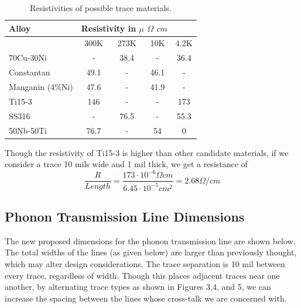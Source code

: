 \documentclass{report}
\begin{document}
\begin{table}[h]
\centering
\begin{threeparttable}
\begin{tabular}{l|c|c|c|c}
Alloy & \multicolumn{3}{c}{Resistivity in $\mu$ $\Omega$ $cm$} \\\toprule
 & 300K & 273K & 10K & 4.2K \\\midrule
70Cu-30Ni & - & 38.4 & - & 36.4 \\
Constantan & 49.1 & - & 46.1 & - \\
Manganin (4\%Ni) & 47.6 & - & 41.9 & - \\
Ti15-3 & 146 & - & - & 173 \\
SS316 & - & 76.5 & - & 55.3 \\
50Nb-50Ti & 76.7 & - & 54 & 0 \\
\end{tabular}
\end{threeparttable}
\caption{Resistivities of possible trace materials.}
\end{table}

Though the resistivity of Ti15-3 is higher than other candidate materials, if we consider a trace 10 mils wide and 1 mil thick, we get a resistance of
$$
\frac{R}{Length} = \frac{173 \cdot 10^{-6} \Omega cm}{6.45 \cdot 10^{-5} cm^{2}} = 2.68 \Omega / cm
$$

\subsection{Phonon Transmission Line Dimensions}

The new proposed dimensions for the phonon transmission line are shown below. The total widths of the lines (as given below) are larger than previously thought, which may alter design considerations. The trace separation is 10 mil between every trace, regardless of width. Though this places adjacent traces near one another, by alternating trace types as shown in Figures 3,4, and 5, we can increase the spacing between the lines whose cross-talk we are concerned with.
\end{document}
